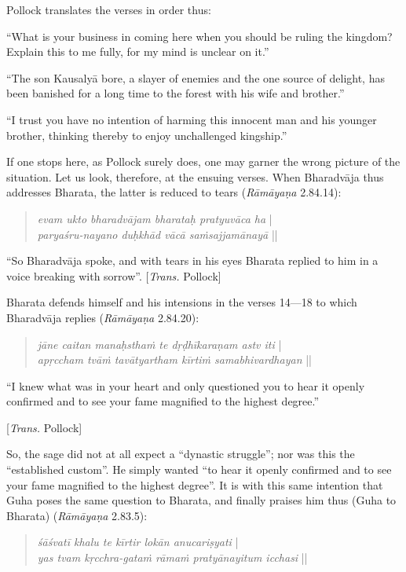 Pollock translates the verses in order thus:

\begin{myquote}
“What is your business in coming here when you should be ruling the kingdom? Explain this to me fully, for my mind is unclear on it.” 

“The son Kausalyā bore, a slayer of enemies and the one source of delight, has been banished for a long time to the forest with his wife and brother.”			 

“I trust you have no intention of harming this innocent man and his younger brother, thinking thereby to enjoy unchallenged kingship.”
\end{myquote}

If one stops here, as Pollock surely does, one may garner the wrong picture of the situation. Let us look, therefore, at the ensuing verses. When Bharadvāja thus addresses Bharata, the latter is reduced to tears ({\sl Rāmāyaṇa} 2.84.14):
\begin{quote}
{{\sl evam ukto bharadvājam bharataḥ pratyuvāca ha}} |\\
{\sl paryaśru-nayano duḥkhād vācā saṁsajjamānayā} || 
\end{quote}

\begin{myquote}
“So Bharadvāja spoke, and with tears in his eyes Bharata replied to him in a voice breaking with sorrow”. [{\sl Trans.} Pollock]  
\end{myquote}

Bharata defends himself and his intensions in the verses 14---18 to which Bharadvāja replies ({\sl Rāmāyaṇa} 2.84.20):
\begin{quote}
{{\sl jāne caitan manaḥsthaṁ te dṛḍhīkaraṇam astv iti}} |\\
{\sl apṛccham tvāṁ tavātyartham kīrtiṁ samabhivardhayan} || 
\end{quote}

\begin{myquote}
“I knew what was in your heart and only questioned you to hear it openly confirmed and to see your fame magnified to the highest degree.” 

\hfill[{\sl Trans.} Pollock]
\end{myquote}

So, the sage did not at all expect a “dynastic struggle”; nor was this the “established custom”. He simply wanted “to hear it openly confirmed and to see your fame magnified to the highest degree”. It is with this same intention that Guha poses the same question to Bharata, and finally praises him thus (Guha to Bharata) ({\sl Rāmāyaṇa} 2.83.5): 
\begin{quote}
{{\sl śāśvatī khalu te kīrtir lokān anucariṣyati}} |\\
{\sl yas tvam kṛcchra-gataṁ rāmaṁ pratyānayitum icchasi} || 
\end{quote}

